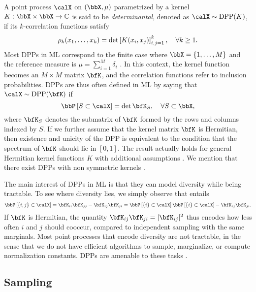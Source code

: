 \documentclass[twoside,11pt]{article}
\begin{document}
    A point process $\calX$ on $(\bbX,\mu)$ parametrized by a kernel $K:\bbX\times \bbX\rightarrow \mathbb{C}$ is said to be \emph{determinantal}, denoted as $\calX\sim\DPP(K)$, if its $k$-correlation functions satisfy
	  \begin{equation*}
	  \label{eq:k-correlation_function_DPP}
	    \rho_k(x_1,\dots,x_k)
	      = \det \left[ K(x_i, x_j) \right]_{i,j=1}^k,
	    \quad \forall k\geq 1.
	  \end{equation*}
		Most DPPs in ML correspond to the finite case where $\bbX = \lrcb{1,\dots,M}$ and the reference measure is $\mu=\sum_{i=1}^M \delta_i$ \citep{KuTa12}.
		In this context, the kernel function becomes an $M\times M$ matrix $\bfK$, and the correlation functions refer to inclusion probabilities. DPPs are thus often defined in ML by saying that $\calX\sim \DPP(\bfK)$ if
	  \begin{equation}
	  \label{eq:inclusion_proba_finite}
	    \Proba{S \subset \calX} = \det {\bfK}_S,
	      \quad\forall S\subset \bbX,
	  \end{equation}
    where ${\bfK}_S$ denotes the submatrix of $\bfK$ formed by the rows and columns indexed by $S$. If we further assume that the kernel matrix $\bfK$ is Hermitian, then existence and unicity of the DPP  is equivalent to the condition that the spectrum of $\bfK$ should lie in $[0,1]$. 
    The result actually holds for general Hermitian kernel functions $K$ with additional assumptions \cite[Theorem 3]{Sos00}. 
    We mention that there exist DPPs with non symmetric kernels \citep{BoDiFu10}.

    The main interest of DPPs in ML is that they can model diversity while being tractable.
    To see where diversity lies, we simply observe that  entails
    $$ \Proba{\{i,j\} \subset \calX} = {\bfK}_{ii}{\bfK}_{jj}-{\bfK}_{ij}{\bfK}_{ji} = \Proba{\{i\} \subset \calX}\Proba{\{i\} \subset \calX} - {\bfK}_{ij}{\bfK}_{ji}.$$
    If $\bfK$ is Hermitian, the quantity ${\bfK}_{ij}{\bfK}_{ji} = \vert{\bfK}_{ij}\vert^2$ thus encodes how less often $i$ and $j$ should cooccur, compared to independent sampling with the same marginals. 
    Most point processes that encode diversity are not tractable, in the sense that we do not have efficient algorithms to sample, marginalize, or compute normalization constants. 
    DPPs are amenable to these tasks \citep{KuTa12}.

  \subsection{Sampling} %
  \label{sub:sampling}
\end{document}
